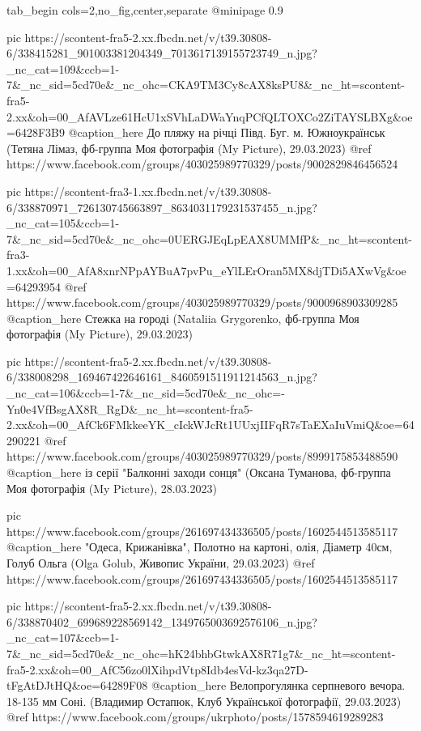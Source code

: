  
 
 
 
 


\ifcmt
  tab_begin cols=2,no_fig,center,separate
     @minipage 0.9

     pic https://scontent-fra5-2.xx.fbcdn.net/v/t39.30808-6/338415281_901003381204349_7013617139155723749_n.jpg?_nc_cat=109&ccb=1-7&_nc_sid=5cd70e&_nc_ohc=CKA9TM3Cy8cAX8ksPU8&_nc_ht=scontent-fra5-2.xx&oh=00_AfAVLze61HcU1xSVhLaDWaYnqPCfQLTOXCo2ZiTAYSLBXg&oe=6428F3B9
     @caption_here До пляжу на річці Півд. Буг. м. Южноукраїнськ (Тетяна Лімаз, фб-группа Моя фотографія (My Picture), 29.03.2023)
     @ref https://www.facebook.com/groups/403025989770329/posts/9002829846456524

     pic https://scontent-fra3-1.xx.fbcdn.net/v/t39.30808-6/338870971_726130745663897_8634031179231537455_n.jpg?_nc_cat=105&ccb=1-7&_nc_sid=5cd70e&_nc_ohc=0UERGJEqLpEAX8UMMfP&_nc_ht=scontent-fra3-1.xx&oh=00_AfA8xnrNPpAYBuA7pvPu_eYlLErOran5MX8djTDi5AXwVg&oe=64293954
     @ref https://www.facebook.com/groups/403025989770329/posts/9000968903309285
     @caption_here Стежка на городі (Nataliia Grygorenko, фб-группа Моя фотографія (My Picture), 29.03.2023)

     pic https://scontent-fra5-2.xx.fbcdn.net/v/t39.30808-6/338008298_169467422646161_8460591511911214563_n.jpg?_nc_cat=106&ccb=1-7&_nc_sid=5cd70e&_nc_ohc=-Yn0e4VfBsgAX8R_RgD&_nc_ht=scontent-fra5-2.xx&oh=00_AfCk6FMkkeeYK_cIckWJcRt1UUxjIIFqR7sTaEXaIuVmiQ&oe=64290221
     @ref https://www.facebook.com/groups/403025989770329/posts/8999175853488590
     @caption_here із серії "Балконні заходи сонця" (Оксана Туманова, фб-группа Моя фотографія (My Picture), 28.03.2023)

     pic https://www.facebook.com/groups/261697434336505/posts/1602544513585117
     @caption_here "Одеса, Крижанівка", Полотно на картоні, олія, Діаметр 40см, Голуб Ольга (Olga Golub, Живопис України, 29.03.2023)
     @ref https://www.facebook.com/groups/261697434336505/posts/1602544513585117

     pic https://scontent-fra5-2.xx.fbcdn.net/v/t39.30808-6/338870402_699689228569142_1349765003692576106_n.jpg?_nc_cat=107&ccb=1-7&_nc_sid=5cd70e&_nc_ohc=hK24bhbGtwkAX8R71g7&_nc_ht=scontent-fra5-2.xx&oh=00_AfC56zo0lXihpdVtp8Idb4esVd-kz3qa27D-tFgAtDJtHQ&oe=64289F08
     @caption_here Велопрогулянка серпневого вечора. 18-135 мм Соні. (Владимир Остапюк, Клуб Української фотографії, 29.03.2023)
     @ref https://www.facebook.com/groups/ukrphoto/posts/1578594619289283

